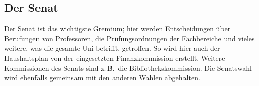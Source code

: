 \begin{multicols*}{2}
\subsection{Der Senat}
Der Senat ist das wichtigste Gremium; hier werden Entscheidungen über Berufungen von Professoren, die Prüfungsordnungen der Fachbereiche und vieles weitere, was die gesamte Uni betrifft, getroffen.
So wird hier auch der Haushaltsplan von der eingesetzten Finanzkommission erstellt.
Weitere Kommissionen des Senats sind z.\,B.\ die Bibliothekskommission.
Die Senatswahl wird ebenfalls gemeinsam mit den anderen Wahlen abgehalten.

\begin{center}
	\setlength{\fboxsep}{2mm}
\end{center}
\end{multicols*}
